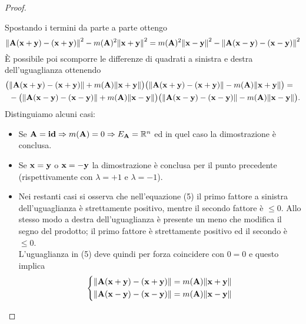 \documentclass[a4paper]{book}
\begin{document}
\begin{proof}
\begin{itemize}
Spostando i termini da parte a parte ottengo
\[ \norm{\vb{A(x+y) - (x+y)}}^2 - m(\vb{A})^2 \norm{\vb{x+y}}^2=  m(\vb{A})^2 \norm{\vb{x-y}}^2 - \norm{\vb{A(x-y) - (x-y)}}^2 \]
\`E possibile poi scomporre le differenze di quadrati a sinistra e destra dell'uguaglianza ottenendo
\begin{equation} 
\begin{split}
\big( & \norm{\vb{A(x+y) - (x+y)}}  + m(\vb{A})\norm{\vb{x+y}} \big) \big( \norm{\vb{A(x+y) - (x+y)}} - m(\vb{A}) \norm{\vb{x+y}} \big) = \\
& -\big( \norm{\vb{A(x-y) - (x-y)}} + m(\vb{A})\norm{\vb{x-y}} \big) \big( \norm{\vb{A(x-y) - (x-y)}} - m(\vb{A}) \norm{\vb{x-y}} \big).
\end{split}
\end{equation}
Distinguiamo alcuni casi: 
\begin{itemize}
\item Se $\vb{A} = \vb{id} \Rightarrow m(\vb{A}) = 0 \Rightarrow E_{\vb{A}} = \mathbb{R}^{n}$  ed in quel caso la dimostrazione è conclusa.
\item Se $\vb{x} = \vb{y}$ o $\vb{x} = \vb{-y}$  la dimostrazione è conclusa per il punto precedente (rispettivamente con $\lambda = +1$ e $\lambda = -1$). 
\item Nei restanti casi si osserva che nell'equazione (5) il primo fattore a sinistra dell'uguaglianza è strettamente positivo, mentre il secondo fattore è $\leq 0 $. Allo stesso modo a destra dell'uguaglianza è presente un meno che modifica il segno del prodotto; il primo fattore è strettamente positivo ed il secondo è $\leq 0 $. \\ L'uguaglianza in (5) deve quindi per forza coincidere con $0=0$ e questo implica 
\begin{equation*}
  \left\{
    \begin{aligned}
      & \norm{\vb{A(x+y) - (x+y)}} = m(\vb{A})\norm{\vb{x+y}} \\
      & \norm{\vb{A(x-y) - (x-y)}} = m(\vb{A})\norm{\vb{x-y}} 
    \end{aligned}
  \right.
\end{equation*}


\end{itemize}
\end{itemize}
\end{proof}
\end{document}
